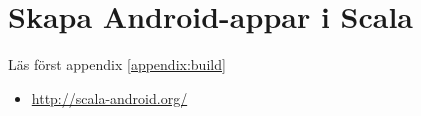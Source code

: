 
\chapter{Skapa Android-appar i Scala}\label{appendix:scala-android}

\TODO

\noindent Läs först appendix \ref{appendix:build}

\begin{itemize}
\item \url{http://scala-android.org/}
\end{itemize}